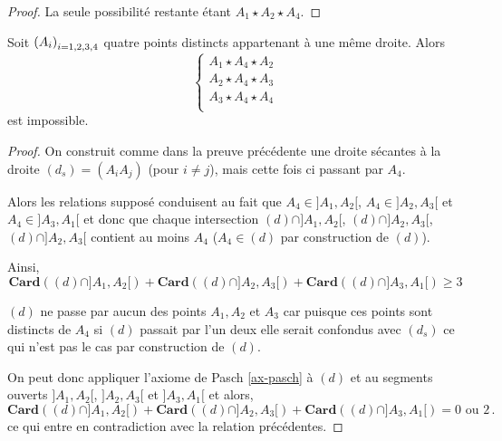 \begin{cor}
\begin{proof}
        La seule possibilité restante étant $A_1 \star A_2 \star A_4$.
    \end{proof}
\end{cor}
\begin{lem}\label{lem-impossibiliteunpointentretous}
Soit $\left(A_{i}\right)_{i = 1,2,3,4}$ quatre points distincts appartenant à une même droite. Alors
    \begin{equation*}
        \left\{
            \begin{array}{c}
                 A_{1} \star A_{4} \star A_{2} \\
                 A_{2} \star A_{4} \star A_{3}\\
                 A_{3} \star A_{4} \star A_{4}\\
            \end{array}
            \right. 
    \end{equation*}
est impossible.
    \begin{proof}
        On construit comme dans la preuve précédente une droite sécantes à la droite $(d_s)=(A_i A_j)$ (pour $i\neq j$), mais cette fois ci passant par $A_4$. 
        
        Alors les relations supposé conduisent au fait que $A_4\in ]A_1,A_2[$,   $A_4\in ]A_2,A_3[$ et $A_4\in ]A_3,A_1[$ et donc que chaque intersection $(d)\cap ]A_1,A_2[$, $(d)\cap ]A_2,A_3[$, $(d)\cap ]A_2,A_3[$ contient au moins $A_4$ ($A_4\in (d)$ par construction de $(d)$).

        Ainsi,
        \begin{equation*}
           \mathbf{Card}\left((d)\cap]A_1,A_2[\right)+\mathbf{Card}\left((d)\cap]A_2,A_3[\right)+\mathbf{Card}\left((d)\cap]A_3,A_1[\right) \geq 3
        \end{equation*}

        $(d)$ ne passe par aucun des points $A_1,A_2$ et $A_3$ car puisque ces points sont distincts de $A_4$ si $(d)$ passait par l'un deux elle serait confondus avec $(d_s)$ ce qui n'est pas le cas par construction de $(d)$.

        On peut donc appliquer l'axiome de Pasch \ref{ax-pasch} à $(d)$ et au segments ouverts $]A_1,A_2[$, $ ]A_2,A_3[$ et $ ]A_3,A_1[$ et alors,
        \begin{equation*}
            \mathbf{Card}\left((d)\cap]A_1,A_2[\right)+\mathbf{Card}\left((d)\cap]A_2,A_3[\right)+\mathbf{Card}\left((d)\cap]A_3,A_1[\right) = 0 \text{ ou }2\,.
        \end{equation*}
        ce qui entre en contradiction avec la relation précédentes.
    \end{proof}
\end{lem}
